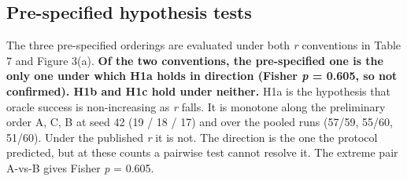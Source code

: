 \documentclass[11pt,a4paper]{article}
\begin{document}
\subsection{Pre-specified hypothesis tests}\label{sec:3.3}

The three pre-specified orderings are evaluated under both \emph{r} conventions in Table 7 and Figure 3(a).
\textbf{Of the two conventions, the pre-specified one is the only one under which H1a holds in
direction (Fisher \emph{p} = 0.605, so not confirmed). H1b and H1c hold under neither.} H1a is
the hypothesis that oracle success is non-increasing as \emph{r} falls. It is monotone along
the preliminary order A, C, B at seed 42 (19 / 18 / 17) and over the pooled runs (57/59,
55/60, 51/60). Under the published \emph{r} it is not. The direction is the one the protocol
predicted, but at these counts a pairwise test cannot resolve it. The extreme pair A-vs-B
gives Fisher \emph{p} = 0.605.
\end{document}
